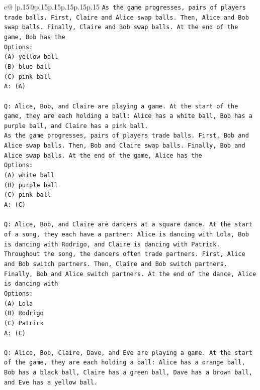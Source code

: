 \documentclass{article}
\begin{document}
{\begin{supertabular}{c@{$\;$}|p{.15\linewidth}@{}p{.15\linewidth}p{.15\linewidth}p{.15\linewidth}p{.15\linewidth}p{.15\linewidth}}
{{{\texttt{As the game progresses, pairs of players trade balls. First, Claire and Alice swap balls. Then, Alice and Bob swap balls. Finally, Claire and Bob swap balls. At the end of the game, Bob has the} \\
\texttt{Options:} \\
\texttt{(A) yellow ball} \\
\texttt{(B) blue ball} \\
\texttt{(C) pink ball} \\
\texttt{A: (A)} \\
\\ 
\texttt{Q: Alice, Bob, and Claire are playing a game. At the start of the game, they are each holding a ball: Alice has a white ball, Bob has a purple ball, and Claire has a pink ball.} \\
\texttt{As the game progresses, pairs of players trade balls. First, Bob and Alice swap balls. Then, Bob and Claire swap balls. Finally, Bob and Alice swap balls. At the end of the game, Alice has the} \\
\texttt{Options:} \\
\texttt{(A) white ball} \\
\texttt{(B) purple ball} \\
\texttt{(C) pink ball} \\
\texttt{A: (C)} \\
\\ 
\texttt{Q: Alice, Bob, and Claire are dancers at a square dance. At the start of a song, they each have a partner: Alice is dancing with Lola, Bob is dancing with Rodrigo, and Claire is dancing with Patrick.} \\
\texttt{Throughout the song, the dancers often trade partners. First, Alice and Bob switch partners. Then, Claire and Bob switch partners. Finally, Bob and Alice switch partners. At the end of the dance, Alice is dancing with} \\
\texttt{Options:} \\
\texttt{(A) Lola} \\
\texttt{(B) Rodrigo} \\
\texttt{(C) Patrick} \\
\texttt{A: (C)} \\
\\ 
\texttt{Q: Alice, Bob, Claire, Dave, and Eve are playing a game. At the start of the game, they are each holding a ball: Alice has a orange ball, Bob has a black ball, Claire has a green ball, Dave has a brown ball, and Eve has a yellow ball.} \\
}}}
\end{supertabular}}
\end{document}
